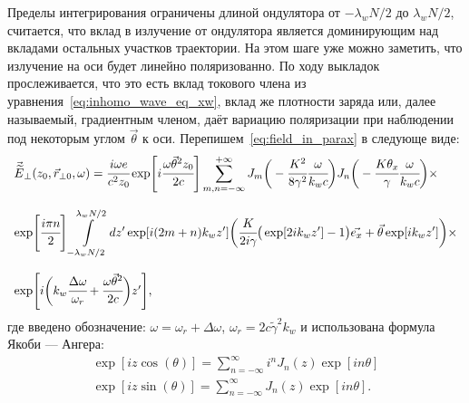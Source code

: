 Пределы интегрирования ограничены длиной ондулятора от $-\lambda_w N/2$ до $\lambda_w N/2$, считается, что вклад в излучение от ондулятора является доминирующим над вкладами остальных участков траектории. На этом шаге уже можно заметить, что излучение на оси будет линейно поляризованно. По ходу выкладок  прослеживается, что это есть вклад токового члена из уравнения~\ref{eq:inhomo_wave_eq_xw}, вклад же плотности заряда или, далее называемый, градиентным членом, даёт вариацию поляризации при наблюдении под некоторым углом $\vec{\theta}$ к оси.
Перепишем~\ref{eq:field_in_parax} в следующе виде:
\begin{equation}
		\label{eq:field_in_parax_Bessel}
		\begin{array}{lcl}
			\vec{\widetilde{E}}_{\bot}(z_0,  \vec{r}_{\bot 0}, \omega) =
			\cfrac{i\omega e}{c^2z_0} \exp[i\cfrac{\omega \vec{\theta}^2 z_0}{2c}]
			\displaystyle\sum_{m,n=-\infty}^{+\infty}
			J_m\bigg(-\cfrac{K^2}{8\gamma^2}\cfrac{\omega}{k_w c}\bigg)
			J_n\bigg(-\cfrac{K{\theta_x}}{\gamma}\cfrac{\omega}{k_w c}\bigg)\times\\
			\\
			\exp[\cfrac{i\pi n}{2}]
			\displaystyle\int\limits_{-\lambda_w N/2}^{\lambda_w N/2} dz'\exp[i(2m + n)k_wz']
			\bigg(\cfrac{K}{2i\gamma}\big(\exp[2ik_w z'] - 1\big)\vec{e_x} + \vec{\theta}\exp[ik_w z']\bigg)\times\\
			\\
			\exp[i\bigg(k_w \cfrac{\Delta\omega}{\omega_r} + 
			\cfrac{\omega\vec{\theta}^2}{2c}\bigg)z'],
		\end{array}	
\end{equation}
где введено обозначение: $\omega = \omega_r + \Delta\omega$, $\omega_r = 2c\widetilde{\gamma}^2k_w$ и использована формула Якоби — Ангера:
\begin{equation}
	\begin{array}{lcl}
		\exp[iz\cos(\theta)] = 
		\displaystyle\sum\limits_{n =-\infty}^{\infty}
		i^n J_n(z)\exp[in\theta]\\	
		\exp[iz\sin(\theta)] = 
		\displaystyle\sum\limits_{n =-\infty}^{\infty}
		J_n(z)\exp[in\theta].
	\end{array}	
\end{equation}

